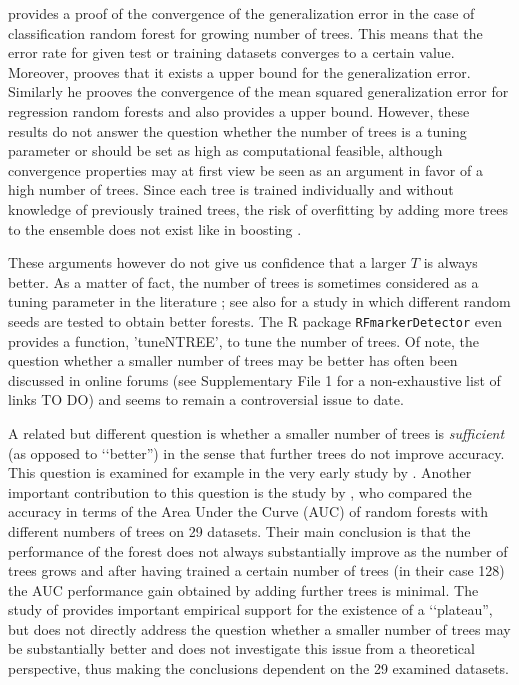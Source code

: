 \documentclass[paper=a4
               ,12pt
               ,DIV=12
               ,parskip=half
               ,titlepage=on
               ,headinclude 
               ,footinclude
               ,headsepline
               ,footsepline         %
               ,ilines 
               ]{scrartcl}
\begin{document}
\cite{Breiman2001} provides a proof of the convergence of the generalization error in the case of classification random forest for growing number of trees. This means that the error rate for given test or training datasets 
converges to a certain value. Moreover, \cite{Breiman2001} prooves that it exists a upper bound for the generalization error. Similarly he prooves the convergence of the mean squared generalization error for regression 
random forests and also provides a upper bound. However, these results do not answer the question whether the number of trees is a tuning parameter or should be set as high as computational feasible, although convergence 
properties may at first view be seen as an argument in favor of a high number of trees. Since each tree is trained individually and without knowledge of previously trained trees, the risk of overfitting by adding more 
trees to the ensemble does not exist like in boosting \citep{Friedman2001}. 

These arguments however do not give us confidence that a larger $T$ is always better. As a matter of fact, the number of trees is sometimes considered as a tuning parameter in the literature \citep{Raghu2015}; see also 
\cite{Barman2014} for a study in which different random seeds are tested to obtain better forests. The R package \texttt{RFmarkerDetector}  \citep{Palla2016} even provides a function, 'tuneNTREE', to tune the number of 
trees. Of note, the question whether a smaller number of trees may be better has often been discussed in online forums (see Supplementary File 1 for a non-exhaustive list of links TO DO) and seems to remain a controversial issue to date. 

A related but different question is whether a smaller number of trees is \textit{sufficient} (as opposed to \lq\lq better'') in the sense that further trees do not improve accuracy. This question is examined for example 
in the very early study by \cite{Latinne2001}. Another important contribution to this question is the study by \citet{Oshiro2012}, who compared the accuracy in terms of the Area Under the Curve (AUC) of random 
forests with different numbers of trees on 29 datasets. Their main conclusion is that the performance of the forest does not always substantially improve as the number of trees grows and after having trained a certain 
number of trees (in their case 128) the AUC performance gain obtained by adding further trees is minimal. The study of \citet{Oshiro2012} provides important empirical support for the existence of a \lq\lq plateau'', 
but does not directly address the question whether a smaller number of trees may be substantially better and does not investigate this issue from a theoretical perspective, thus making the conclusions dependent on the 29 examined datasets. 
\end{document}

